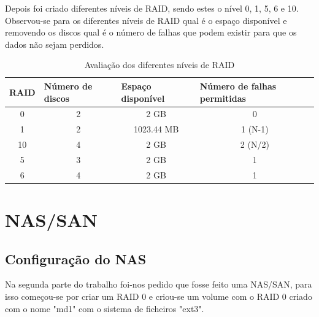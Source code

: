 \documentclass[pdftex,12pt,a4paper]{report}
\begin{document}
Depois foi criado diferentes níveis de RAID, sendo estes o nível 0, 1, 5, 6 e 10. Observou-se para os diferentes níveis de RAID qual é o espaço disponível e removendo os discos qual é o número de falhas que podem existir para que os dados não sejam perdidos. 

\begin{table}[!htb]
\centering
\caption{Avaliação dos diferentes níveis de RAID}
\label{my-label}
\begin{tabular}{|c|c|c|c|}
\hline
\multicolumn{1}{|l|}{\textbf{RAID}} & \multicolumn{1}{l|}{\textbf{Número de discos}} & \multicolumn{1}{l|}{\textbf{Espaço disponível}} & \multicolumn{1}{l|}{\textbf{Número de falhas permitidas}} \\ \hline
0                                   & 2                                              & 2 GB                                            & 0                                                        \\ \hline
1                                   & 2                                              & 1023.44 MB                                      & 1 (N-1)                                                  \\ \hline
10                                  & 4                                              & 2 GB                                            & 2 (N/2)                                                  \\ \hline
5                                   & 3                                              & 2 GB                                            & 1                                                        \\ \hline
6                                   & 4                                              & 2 GB                                            & 1                                                        \\ \hline
\end{tabular}
\end{table}

\section{NAS/SAN}

\subsection{Configuração do NAS}

Na segunda parte do trabalho foi-nos pedido que fosse feito uma NAS/SAN, para isso começou-se por criar um RAID 0 e criou-se um volume com o RAID 0 criado com o nome "md1" com o sistema de ficheiros "ext3". 
\end{document}
